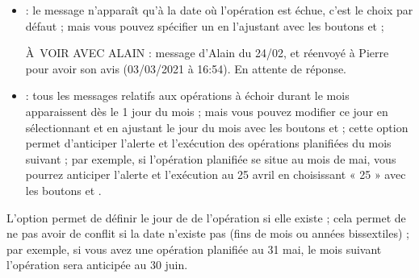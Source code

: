 \begin{itemize}
	\ifIllustration
	\label{setup-plannedtransactions-img}
	\fi
	\item {} : le message n'apparaît qu'à la date où l'opération est échue, c'est le choix par défaut ; mais vous pouvez spécifier un  en l'ajustant avec les boutons \menu{+} et \menu{-} ;
	
	À VOIR AVEC ALAIN : message d'Alain du 24/02, et réenvoyé à Pierre pour avoir son avis (03/03/2021 à 16:54). En attente de réponse.
	
	
	
	
	\item {} : tous les messages relatifs aux  opérations à échoir durant le mois  apparaissent dès le 1 jour du mois ; mais vous pouvez modifier ce jour en sélectionnant  et en ajustant le jour du mois avec les boutons \menu{+} et \menu{-} ; cette option permet d'anticiper l'alerte et l'exécution des opérations planifiées du mois suivant ; par exemple, si l'opération planifiée se situe au mois de mai, vous pourrez anticiper l'alerte et l'exécution au 25 avril en choisissant « 25 » avec les boutons \menu{+} et \menu{-}.
\end{itemize}

	
L'option  permet de définir le jour de de l'opération si elle existe ; cela permet de ne pas avoir de conflit si la date n'existe pas (fins de mois ou années bissextiles) ; par exemple, si vous avez une opération planifiée au 31 mai, le mois suivant l'opération sera anticipée au 30 juin.


\ifIllustration
\fi




